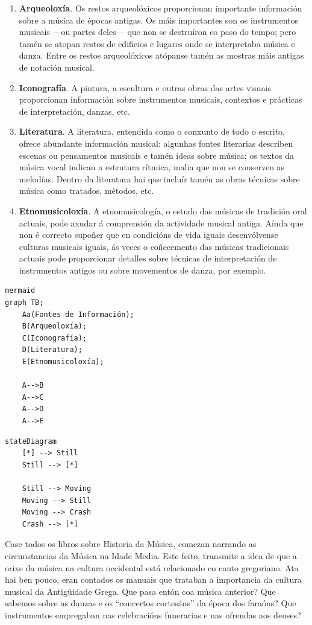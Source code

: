 \documentclass[a4paper, twoside]{templates/ociamthesis}
\providecommand{\tightlist}{%
  \setlength{\itemsep}{0pt}\setlength{\parskip}{0pt}}
\begin{document}
\begin{enumerate}
\def\labelenumi{\arabic{enumi}.}
\tightlist
\item
  \textbf{Arqueoloxía}. Os restos arqueolóxicos proporcionan importante información sobre a música de épocas antigas. Os máis importantes son os instrumentos musicais ---ou partes deles--- que non se destruíron co paso do tempo; pero tamén se atopan restos de edificios e lugares onde se interpretaba música e danza. Entre os restos arqueolóxicos atópanse tamén as mostras máis antigas de notación musical.
\item
  \textbf{Iconografía}. A pintura, a escultura e outras obras das artes visuais proporcionan información sobre instrumentos musicais, contextos e prácticas de interpretación, danzas, etc.
\item
  \textbf{Literatura}. A literatura, entendida como o conxunto de todo o escrito, ofrece abundante información musical: algunhas fontes literarias describen escenas ou pensamentos musicais e tamén ideas sobre música; os textos da música vocal indican a estrutura rítmica, malia que non se conserven as melodías. Dentro da literatura hai que incluír tamén as obras técnicas sobre música como tratados, métodos, etc.
\item
  \textbf{Etnomusicoloxía}. A etnomusicología, o estudo das músicas de tradición oral actuais, pode axudar á comprensión da actividade musical antiga. Aínda que non é correcto supoñer que en condicións de vida iguais desenvólvense culturas musicais iguais, ás veces o coñecemento das músicas tradicionais actuais pode proporcionar detalles sobre técnicas de interpretación de instrumentos antigos ou sobre movementos de danza, por exemplo.
\end{enumerate}

\begin{verbatim}
mermaid
graph TB;
    Aa(Fontes de Información);
    B(Arqueoloxía);
    C(Iconografía);
    D(Literatura);
    E(Etnomusicoloxía);
    
    A-->B
    A-->C
    A-->D
    A-->E
\end{verbatim}

\begin{verbatim}
stateDiagram
    [*] --> Still
    Still --> [*]

    Still --> Moving
    Moving --> Still
    Moving --> Crash
    Crash --> [*]
\end{verbatim}

Case todos os libros sobre Historia da Música, comezan narrando as circunstancias da Música na Idade Media. Este feito, transmite a idea de que a orixe da música na cultura occidental está relacionado co canto gregoriano. Ata hai ben pouco, eran contados os manuais que trataban a importancia da cultura musical da Antigüidade Grega. Que pasa entón coa música anterior? Que sabemos sobre as danzas e os ``concertos cortesáns'' da época dos faraóns? Que instrumentos empregaban nas celebracións funerarias e nas ofrendas aos deuses?
\end{document}
